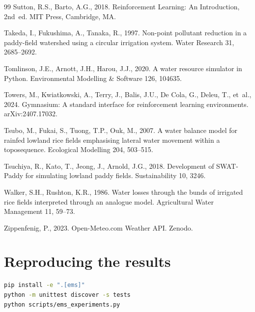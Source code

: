 \documentclass[preprint,12pt,authoryear,review]{elsarticle}
\begin{document}
\begin{thebibliography}{99}
Sutton, R.S., Barto, A.G., 2018. Reinforcement Learning: An Introduction, 2nd~ed. MIT Press, Cambridge, MA.

Takeda, I., Fukushima, A., Tanaka, R., 1997. Non-point pollutant reduction in a paddy-field watershed using a circular irrigation system. Water Research 31, 2685--2692. 

Tomlinson, J.E., Arnott, J.H., Harou, J.J., 2020. A water resource simulator in Python. Environmental Modelling \& Software 126, 104635. 

Towers, M., Kwiatkowski, A., Terry, J., Balis, J.U., De Cola, G., Deleu, T., et~al., 2024. Gymnasium: A standard interface for reinforcement learning environments. arXiv:2407.17032.

Tsubo, M., Fukai, S., Tuong, T.P., Ouk, M., 2007. A water balance model for rainfed lowland rice fields emphasising lateral water movement within a toposequence. Ecological Modelling 204, 503--515. 

Tsuchiya, R., Kato, T., Jeong, J., Arnold, J.G., 2018. Development of SWAT-Paddy for simulating lowland paddy fields. Sustainability 10, 3246. 

Walker, S.H., Rushton, K.R., 1986. Water losses through the bunds of irrigated rice fields interpreted through an analogue model. Agricultural Water Management 11, 59--73. 

Zippenfenig, P., 2023. Open-Meteo.com Weather API. Zenodo. 

\end{thebibliography}

\appendix

\section{Reproducing the results}
\label{app:repro}

\begin{lstlisting}[language=Bash]
pip install -e ".[ems]"
python -m unittest discover -s tests
python scripts/ems_experiments.py
\end{lstlisting}
\end{document}
